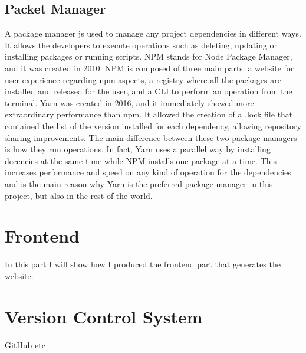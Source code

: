 \subsection{Packet Manager}
\label{ss:Packet-Manager}

A package manager js used to manage any project dependencies in different ways.
It allows the developers to execute operations such as deleting, updating or
installing packages or running scripts. NPM stands for Node Package Manager, and
it was created in 2010. NPM is composed of three main parts: a website for user
experience regarding npm aspects, a registry where all the packages are
installed and released for the user, and a CLI to perform an operation from the
terminal. Yarn was created in 2016, and it immediately showed more extraordinary
performance than npm. It allowed the creation of a .lock file that contained the
list of the version installed for each dependency, allowing repository sharing
improvements. The main difference between these two package managers is how they
run operations. In fact, Yarn uses a parallel way by installing decencies at the
same time while NPM installs one package at a time. This increases performance
and speed on any kind of operation for the dependencies and is the main reason
why Yarn is the preferred package manager in this project, but also in the rest
of the world.

\section{Frontend}
\label{s:Frontend}
In this part I will show how I produced the frontend part that generates the
website.

\section{Version Control System}
\label{s:Version-Control-System}
GitHub etc

